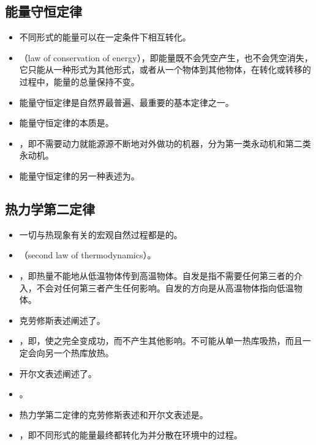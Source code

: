 \subsection{能量守恒定律}
\begin{itemize}
\item 不同形式的能量可以在一定条件下相互转化。
\item {}（law of conservation of energy），即能量既不会凭空产生，也不会凭空消失，它只能从一种形式为其他形式，或者从一个物体到其他物体，在转化或转移的过程中，能量的总量保持不变。
\item 能量守恒定律是自然界最普遍、最重要的基本定律之一。
\item 能量守恒定律的本质是。
\item {}，即不需要动力就能源源不断地对外做功的机器，分为第一类永动机和第二类永动机。
\item 能量守恒定律的另一种表述为。
\end{itemize}

\subsection{热力学第二定律}
\begin{itemize}
\item 一切与热现象有关的宏观自然过程都是的。
\item {}（second law of thermodynamics）。
\item {}，即热量不能地从低温物体传到高温物体。自发是指不需要任何第三者的介入，不会对任何第三者产生任何影响。自发的方向是从高温物体指向低温物体。
\item 克劳修斯表述阐述了。
\item {}，即，使之完全变成功，而不产生其他影响。不可能从单一热库吸热，而且一定会向另一个热库放热。
\item 开尔文表述阐述了。
\item {}。
\item 热力学第二定律的克劳修斯表述和开尔文表述是。
\item {}，即不同形式的能量最终都转化为并分散在环境中的过程。
\end{itemize}
